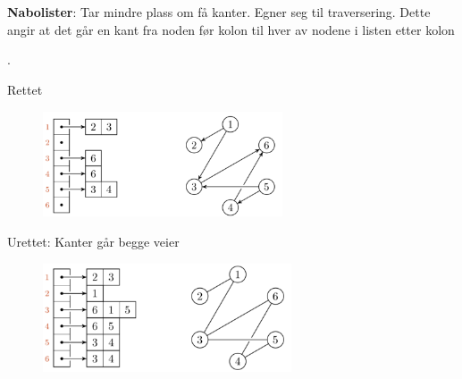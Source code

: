 \documentclass[12pt]{report}
\begin{document}
\vspace{\baselineskip}

\vspace{\baselineskip}

\vspace{\baselineskip}

\vspace{\baselineskip}
\setlength{\parskip}{0.0pt}
\textbf{Nabolister}: Tar mindre plass om få kanter. Egner seg til traversering. Dette angir at det går en kant fra noden før kolon til hver av nodene i listen etter kolon{\fontsize{13pt}{15.6pt}\selectfont .\par}\par


\vspace{\baselineskip}

\vspace{\baselineskip}
\begin{multicols}{2}
{\fontsize{13pt}{15.6pt}\selectfont Rettet\par}\par




\begin{figure}[H]
	\begin{Center}
		\includegraphics[width=2.79in,height=1.23in]{./media/image67.png}
	\end{Center}
\end{figure}



\par

{\fontsize{13pt}{15.6pt}\selectfont Urettet: Kanter går begge veier\par}\par




\begin{figure}[H]
	\begin{Center}
		\includegraphics[width=2.9in,height=1.27in]{./media/image68.png}
	\end{Center}
\end{figure}




\end{multicols}
\end{document}
